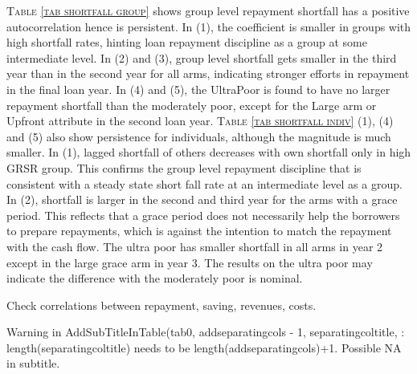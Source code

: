 \begin{palepinkleftbar}
\begin{finding}
\textsc{\small Table \ref{tab shortfall group}} shows group level repayment shortfall has a positive autocorrelation hence is persistent. In (1), the coefficient is smaller in groups with high shortfall rates, hinting loan repayment discipline as a group at some intermediate level. In (2) and (3), group level shortfall gets smaller in the third year than in the second year for all arms, indicating stronger efforts in repayment in the final loan year. In (4) and (5), the \textsf{UltraPoor} is found to have no larger repayment shortfall than the moderately poor, except for the \textsf{Large} arm or \textsf{Upfront} attribute in the second loan year. \textsc{\small Table \ref{tab shortfall indiv}} (1), (4) and (5) also show persistence for individuals, although the magnitude is much smaller. In (1), lagged shortfall of others decreases with own shortfall only in high GRSR group. This confirms the group level repayment discipline that is consistent with a steady state short fall rate at an intermediate level as a group.  In (2), shortfall is larger in the second and third year for the arms with a grace period. This reflects that a grace period does not necessarily help the borrowers to prepare repayments, which is against the intention to match the repayment with the cash flow. The ultra poor has smaller shortfall in all arms in year 2 except in the large grace arm in year 3. The results on the ultra poor may indicate the difference with the moderately poor is nominal.
\end{finding}
\end{palepinkleftbar}


Check correlations between repayment, saving, revenues, costs.
\begin{Schunk}
\begin{Soutput}
Warning in AddSubTitleInTable(tab0, addseparatingcols - 1, separatingcoltitle, : length(separatingcoltitle) needs to be length(addseparatingcols)+1. Possible NA in subtitle.
\end{Soutput}
\end{Schunk}


